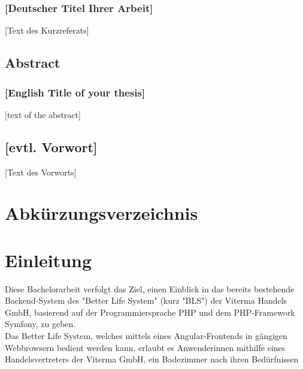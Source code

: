\documentclass[a4paper,12pt,twoside]{scrreprt}
\begin{document}
\subsection*{[Deutscher Titel Ihrer Arbeit]}

[Text des Kurzreferats]

\newpage
\section*{Abstract}
\subsection*{[English Title of your thesis]}

[text of the abstract]

\newpage
\section*{[evtl. Vorwort]}

[Text des Vorworts]

\cleardoublepage %
\tableofcontents

\clearpage
{}
{}
\listoffigures

\clearpage
{}
{}
\listoftables

\clearpage
{}
{}
\chapter*{Abkürzungsverzeichnis}
\begin{acronym}
\end{acronym}

\chapter{Einleitung}
Diese Bachelorarbeit verfolgt das Ziel, einen Einblick in das bereits bestehende Backend-System des "Better Life System" (kurz "BLS") der Viterma Handels GmbH, basierend auf der Programmiersprache PHP und dem PHP-Framework Symfony, zu geben.\\
Das Better Life System, welches mittels eines Angular-Frontends in gängigen Webbrowsern bedient werden kann, erlaubt es Anwenderinnen mithilfe eines Handelsvertreters der Viterma GmbH, ein Badezimmer nach ihren Bedürfnissen 
\end{document}
